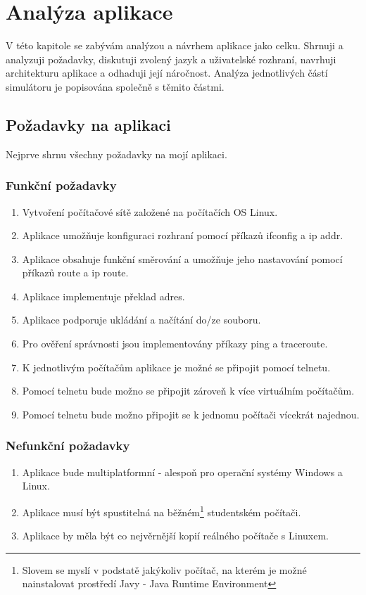 
\chapter{Analýza aplikace}

V této kapitole se zabývám analýzou a návrhem aplikace jako celku. Shrnuji a analyzuji požadavky, diskutuji zvolený jazyk a uživatelské rozhraní, navrhuji architekturu aplikace a odhaduji její náročnost. Analýza jednotlivých částí simulátoru je popisována společně s těmito částmi.



\section{Požadavky na aplikaci}

Nejprve shrnu všechny požadavky na mojí aplikaci.

\subsection{Funkční požadavky}
\begin{enumerate}
 \item Vytvoření počítačové sítě založené na počítačích OS Linux.
 \item Aplikace umožňuje konfiguraci rozhraní pomocí příkazů ifconfig a ip addr.
 \item Aplikace obsahuje funkční směrování a umožňuje jeho nastavování pomocí příkazů route a ip route.
 \item Aplikace implementuje překlad adres.
 \item Aplikace podporuje ukládání a načítání do/ze souboru.
 \item Pro ověření správnosti jsou implementovány příkazy ping a traceroute.
 \item K jednotlivým počítačům aplikace je možné se připojit pomocí telnetu.
 \item Pomocí telnetu bude možno se připojit zároveň k více virtuálním počítačům.
 \item Pomocí telnetu bude možno připojit se k jednomu počítači vícekrát najednou.
\end{enumerate}

\subsection{Nefunkční požadavky}
\begin{enumerate}
 \item Aplikace bude multiplatformní - alespoň pro operační systémy Windows a Linux.
 \item Aplikace musí být spustitelná na běžném\footnote{Slovem  se myslí v podstatě jakýkoliv počítač, na kterém je možné nainstalovat prostředí Javy - Java Runtime Environment} studentském počítači.
 \item Aplikace by měla být co nejvěrnější kopií reálného počítače s Linuxem.
\end{enumerate}



